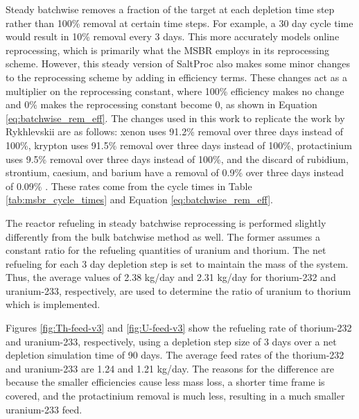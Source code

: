 Steady batchwise removes a fraction of the target at each depletion time step rather than 100\% removal at certain time steps.
For example, a 30 day cycle time would result in 10\% removal every 3 days. This more accurately models online reprocessing, which is primarily what the MSBR employs in its reprocessing scheme. However, this steady version of SaltProc also makes some minor changes to the reprocessing scheme by adding in efficiency terms. These changes act as a multiplier on the reprocessing constant, where 100\% efficiency makes no change and 0\% makes the reprocessing constant become 0, as shown in Equation \eqref{eq:batchwise_rem_eff}. The changes used in this work to replicate the work by Rykhlevskii are as follows: xenon uses 91.2\% removal over three days instead of 100\%, krypton uses 91.5\% removal over three days instead of 100\%, protactinium uses 9.5\% removal over three days instead of 100\%, and the discard of rubidium, strontium, caesium, and barium have a removal of 0.9\% over three days instead of 0.09\% \cite{rykhlevskii_fuel_2020, rykhlevskii_saltproc_2018}. These rates come from the cycle times in Table \ref{tab:msbr_cycle_times} and Equation \eqref{eq:batchwise_rem_eff}.

The reactor refueling in steady batchwise reprocessing is performed slightly differently from the bulk batchwise method as well. The former assumes a constant ratio for the refueling quantities of uranium and thorium. The net refueling for each 3 day depletion step is set to maintain the mass of the system. Thus, the average values of 2.38 kg/day and 2.31 kg/day for thorium-232 and uranium-233, respectively, are used to determine the ratio of uranium to thorium which is implemented.

Figures \ref{fig:Th-feed-v3} and \ref{fig:U-feed-v3} show the refueling rate of thorium-232 and uranium-233, respectively, using a depletion step size of 3 days over a net depletion simulation time of 90 days. The average feed rates of the thorium-232 and uranium-233 are 1.24 and 1.21 kg/day. The reasons for the difference are because the smaller efficiencies cause less mass loss, a shorter time frame is covered, and the protactinium removal is much less, resulting in a much smaller uranium-233 feed.

